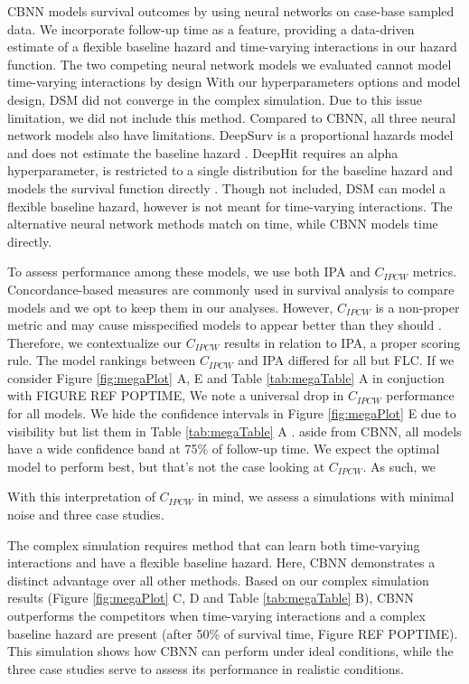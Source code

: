 \documentclass[APA,LATO1COL]{WileyNJD-v2}
\begin{document}
CBNN models survival outcomes by using neural networks on case-base
sampled data. We incorporate follow-up time as a feature, providing a
data-driven estimate of a flexible baseline hazard and time-varying
interactions in our hazard function. The two competing neural network
models we evaluated cannot model time-varying interactions by design
 \citep{katzman2018DeepSurv} \citep{lee2018DeepHit}
With our hyperparameters options and model design, DSM did not
converge in the complex simulation. Due to this issue limitation,
we did not include this method. Compared to CBNN, all three neural network
models also have limitations. DeepSurv is a proportional hazards model and does
not estimate the baseline hazard \citep{katzman2018DeepSurv}. DeepHit
requires an alpha hyperparameter, is restricted to a single distribution
for the baseline hazard and models the survival function directly
\citep{lee2018DeepHit}. Though not included, DSM can model a flexible
baseline hazard, however is not meant for time-varying interactions\citep{dsmPaper}.
The alternative neural network methods match on time, while CBNN models time directly.

To assess performance among these models, we use both IPA and
\(C_{IPCW}\) metrics. Concordance-based measures are commonly used in
survival analysis to compare models and we opt to keep them in our
analyses. However, \(C_{IPCW}\) is a non-proper metric and may cause
misspecified models to appear better than they should
\citep{cindexfails2019}. Therefore, we contextualize our \(C_{IPCW}\)
results in relation to IPA, a proper scoring rule. The model rankings
between \(C_{IPCW}\) and IPA differed for all but FLC. If we consider
Figure \ref{fig:megaPlot} A, E and Table \ref{tab:megaTable} A in conjuction
with FIGURE REF POPTIME, We note a universal drop in \(C_{IPCW}\) performance
for all models. We hide the confidence intervals in Figure \ref{fig:megaPlot} E due to visibility but list them in Table \ref{tab:megaTable} A .
aside from CBNN, all models have a wide confidence band at 75\% of follow-up time.
We expect the optimal model to perform best, but that's not the case looking at  \(C_{IPCW}\).
As such, we 

With this interpretation of \(C_{IPCW}\) in mind, we assess a
simulations with minimal noise and three case studies.

The complex simulation requires method that can learn both time-varying
interactions and have a flexible baseline hazard. Here, CBNN demonstrates
a distinct advantage over all other methods. Based on our complex simulation results (Figure
\ref{fig:megaPlot} C, D and Table \ref{tab:megaTable} B), CBNN
outperforms the competitors when time-varying interactions and a complex
baseline hazard are present (after 50\% of survival time, Figure REF POPTIME).
This simulation shows how CBNN can perform
under ideal conditions, while the three case studies
serve to assess its performance in realistic conditions.
\end{document}
